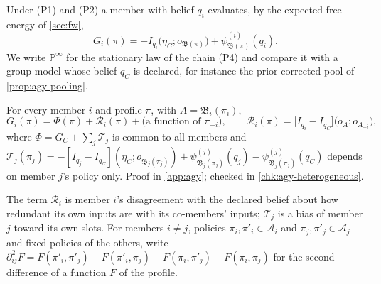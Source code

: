 Under (P1) and (P2) a member with belief $q_i$ evaluates, by the expected free energy of \cref{sec:fw},
\begin{equation}\label{eq:agy-member-efe}
G_i(\pi)=-I_{q_i}\bigl(\eta_C;o_{\mathfrak B(\pi)}\bigr)+\psi^{(i)}_{\mathfrak B(\pi)}(q_i).
\end{equation}
We write $\mathbb P^\infty$ for the stationary law of the chain (P4) and compare it with a group model whose belief $q_C$ is declared, for instance the prior-corrected pool of \cref{prop:agy-pooling}.

\begin{lemma}\label{lem:agy-decomposition}
For every member $i$ and profile $\pi$, with $A=\mathfrak B_i(\pi_i)$,
\begin{equation}\label{eq:agy-decomposition}
G_i(\pi)=\Phi(\pi)+\mathcal R_i(\pi)+\bigl(\text{a function of }\pi_{-i}\bigr),\qquad\mathcal R_i(\pi)=\bigl[I_{q_i}-I_{q_C}\bigr]\bigl(o_A;o_{A_{-i}}\bigr),
\end{equation}
where $\Phi=G_C+\sum_j\mathcal T_j$ is common to all members and $\mathcal T_j(\pi_j)=-[I_{q_j}-I_{q_C}](\eta_C;o_{\mathfrak B_j(\pi_j)})+\psi^{(j)}_{\mathfrak B_j(\pi_j)}(q_j)-\psi^{(j)}_{\mathfrak B_j(\pi_j)}(q_C)$ depends on member $j$'s policy only. Proof in \cref{app:agy}; checked in \cref{chk:agy-heterogeneous}.
\end{lemma}

The term $\mathcal R_i$ is member $i$'s disagreement with the declared belief about how redundant its own inputs are with its co-members' inputs; $\mathcal T_j$ is a bias of member $j$ toward its own slots. For members $i\ne j$, policies $\pi_i,\pi'_i\in\mathcal A_i$ and $\pi_j,\pi'_j\in\mathcal A_j$ and fixed policies of the others, write $\partial^2_{ij}F=F(\pi'_i,\pi'_j)-F(\pi'_i,\pi_j)-F(\pi_i,\pi'_j)+F(\pi_i,\pi_j)$ for the second difference of a function $F$ of the profile.

